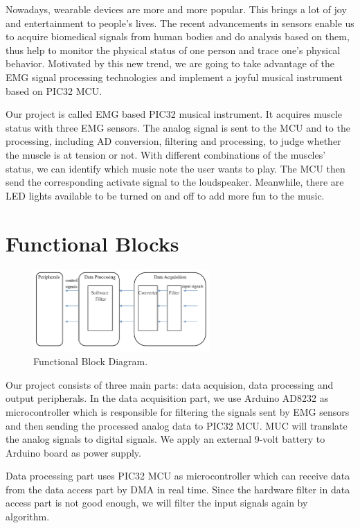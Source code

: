 \documentclass[12pt]{article}
\begin{document}
Nowadays, wearable devices are more and more popular. This brings a lot of joy and entertainment to people’s lives. The recent advancements in sensors enable us to acquire biomedical signals from human bodies and do analysis based on them, thus help to monitor the physical status of one person and trace one’s physical behavior. Motivated by this new trend, we are going to take advantage of the EMG signal processing technologies and implement a joyful musical instrument based on PIC32 MCU. 

Our project is called EMG based PIC32 musical instrument. It acquires muscle status with three EMG sensors. The analog signal is sent to the MCU and to the processing, including AD conversion, filtering and processing, to judge whether the muscle is at tension or not. With different combinations of the muscles’ status, we can identify which music note the user wants to play. The MCU then send the corresponding activate signal to the loudspeaker. Meanwhile, there are LED lights available to be turned on and off to add more fun to the music.


\section{Functional Blocks}
\begin{figure}[H]
\centering
\includegraphics[width=0.6\textwidth]{block-diagram.png}
\caption{Functional Block Diagram.}
\end{figure}

Our project consists of three main parts: data acquision, data processing and output peripherals. In the data acquisition part, we use Arduino AD8232 as microcontroller which is responsible for filtering the signals sent by EMG sensors and then sending the processed analog data to PIC32 MCU. MUC will translate the analog signals to digital signals. We apply an external 9-volt battery to Arduino board as power supply.

Data processing part uses PIC32 MCU as microcontroller which can receive data from the data access part by DMA in real time. Since the hardware filter in data access part is not good enough, we will filter the input signals again by algorithm.
\end{document}
